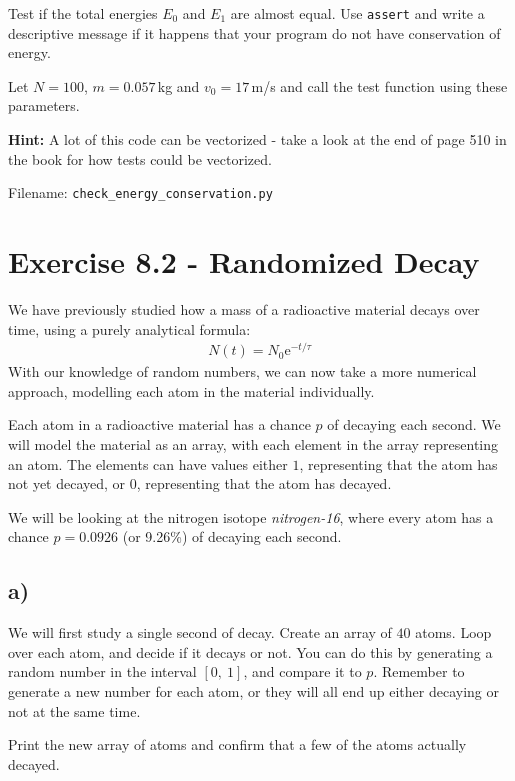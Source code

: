 \documentclass[10pt,a4paper]{article}
\renewcommand{\exp}{\mathrm{e}^}
\begin{document}
Test if the total energies $E_0$ and $E_1$ are almost equal. Use \texttt{assert} and write a descriptive message if it happens that your program do not have conservation of energy. 

Let  $N = 100$, $m = 0.057\,$kg and $v_0 = 17\,$m/s and call the test function using these parameters. 

\textbf{Hint:} A lot of this code can be vectorized - take a look at the end of page 510 in the book for how tests could be vectorized. 

Filename: \texttt{check\_energy\_conservation.py}






\section*{Exercise 8.2 - Randomized Decay}

We have previously studied how a mass of a radioactive material decays over time, using a purely analytical formula:
\begin{align}
N(t) = N_0 \exp{-t/\tau} \label{eqn:8.2}
\end{align}
With our knowledge of random numbers, we can now take a more numerical approach, modelling each atom in the material individually.

Each atom in a radioactive material has a chance $p$ of decaying each second. We will model the material as an array, with each element in the array representing an atom. The elements can have values either $1$, representing that the atom has not yet decayed, or $0$, representing that the atom has decayed.

We will be looking at the nitrogen isotope \textit{nitrogen-16}, where every atom has a chance $p = 0.0926$ (or 9.26\%) of decaying each second.

\subsection*{a)}
We will first study a single second of decay. Create an array of $40$ atoms. Loop over each atom, and decide if it decays or not. You can do this by generating a random number in the interval $[0,\ 1]$, and compare it to $p$. Remember to generate a new number for each atom, or they will all end up either decaying or not at the same time.

Print the new array of atoms and confirm that a few of the atoms actually decayed.
\end{document}
